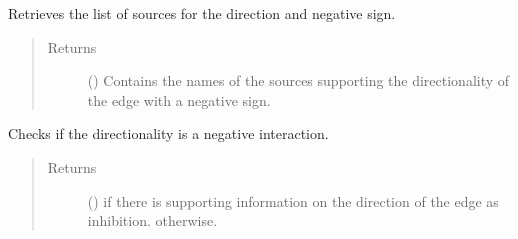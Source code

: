 \documentclass[letterpaper,10pt,english]{sphinxmanual}
\begin{document}
\begin{fulllineitems}

\begin{fulllineitems}
\label{\detokenize{reference:pypath.main.Direction.negative_sources_straight}}
Retrieves the list of sources for the 
direction and negative sign.
\begin{quote}\begin{description}
\item[{Returns}] \leavevmode
() \textendash{} Contains the names of the sources supporting the
 directionality of the edge with a
negative sign.

\end{description}\end{quote}

\end{fulllineitems}


\begin{fulllineitems}
\label{\detokenize{reference:pypath.main.Direction.negative_straight}}
Checks if the  directionality is a negative
interaction.
\begin{quote}\begin{description}
\item[{Returns}] \leavevmode
() \textendash{}  if there is supporting information on
the  direction of the edge as inhibition.
 otherwise.

\end{description}\end{quote}

\end{fulllineitems}



\end{fulllineitems}
\end{document}
